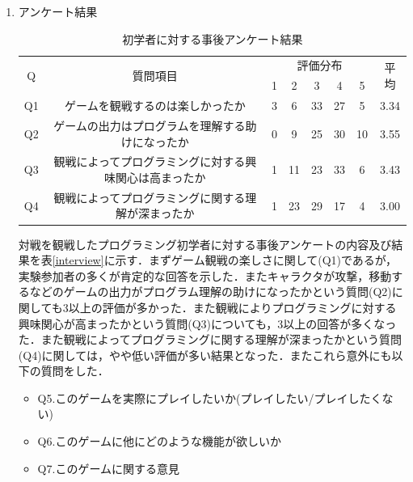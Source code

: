 \begin{enumerate}
  \item アンケート結果

  \begin{table}[h]
    \centering
    \caption{初学者に対する事後アンケート結果}
    \label{beginner_interview}
      \begin{tabular}{|c|c|c|c|c|c|c|c|} \hline
        \multirow{2}{*}{Q} & \multirow{2}{*}{質問項目} & \multicolumn{5}{c}{評価分布} & \multirow{2}{*}{平均} \\
        & & 1 & 2 & 3 & 4 & 5 & \\ \hline\hline
        Q1 & ゲームを観戦するのは楽しかったか & 3 & 6 & 33 & 27 & 5 & 3.34\\ \hline
        Q2 & ゲームの出力はプログラムを理解する助けになったか & 0 & 9 & 25 & 30 & 10 & 3.55\\ \hline
        Q3 & 観戦によってプログラミングに対する興味関心は高まったか & 1 & 11 & 23 & 33 & 6 & 3.43\\ \hline
        Q4 & 観戦によってプログラミングに関する理解が深まったか & 1 & 23 & 29 & 17 & 4 & 3.00\\ \hline
      \end{tabular}
  \end{table}

  対戦を観戦したプログラミング初学者に対する事後アンケートの内容及び結果を表\ref{interview}に示す．まずゲーム観戦の楽しさに関して(Q1)であるが，実験参加者の多くが肯定的な回答を示した．またキャラクタが攻撃，移動するなどのゲームの出力がプログラム理解の助けになったかという質問(Q2)に関しても3以上の評価が多かった．また観戦によりプログラミングに対する興味関心が高まったかという質問(Q3)についても，3以上の回答が多くなった．また観戦によってプログラミングに関する理解が深まったかという質問(Q4)に関しては，やや低い評価が多い結果となった．またこれら意外にも以下の質問をした．

  \begin{itemize}
    \item Q5.このゲームを実際にプレイしたいか(プレイしたい/プレイしたくない)
    \item Q6.このゲームに他にどのような機能が欲しいか
    \item Q7.このゲームに関する意見
  \end{itemize}


\end{enumerate}
